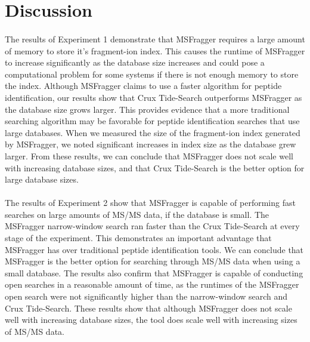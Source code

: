 \documentclass [11pt] {article}
\begin{document}
	
	\section  {Discussion}
	
	\paragraph {}
	\qquad 
	
	\qquad The results of Experiment 1 demonstrate that MSFragger requires a large amount of memory to store it's fragment-ion index.  This causes the runtime of MSFragger to increase significantly as the database size increases and could pose a computational problem for some systems if there is not enough memory to store the index.  Although MSFragger claims to use a faster algorithm for peptide identification, our results show that Crux Tide-Search outperforms MSFragger as the database size grows larger.  This provides evidence that a more traditional searching algorithm may be favorable for peptide identification searches that use large databases.  When we measured the size of the fragment-ion index generated by MSFragger, we noted significant increases in index size as the database grew larger.  From these results, we can conclude that MSFragger does not scale well with increasing database sizes, and that Crux Tide-Search is the better option for large database sizes.  
	\paragraph {}
	\qquad The results of Experiment 2 show that MSFragger is capable of performing fast searches on large amounts of MS/MS data, if the database is small.  The MSFragger narrow-window search ran faster than the Crux Tide-Search at every stage of the experiment.  This demonstrates an important advantage that MSFragger has over traditional peptide identification tools.  We can conclude that MSFragger is the better option for searching through MS/MS data when using a small database.  The results also confirm that MSFragger is capable of conducting open searches in a reasonable amount of time, as the runtimes of the MSFragger open search were not significantly higher than the narrow-window search and Crux Tide-Search.  These results show that although MSFragger does not scale well with increasing database sizes, the tool does scale well with increasing sizes of MS/MS data.  
\end{document}

